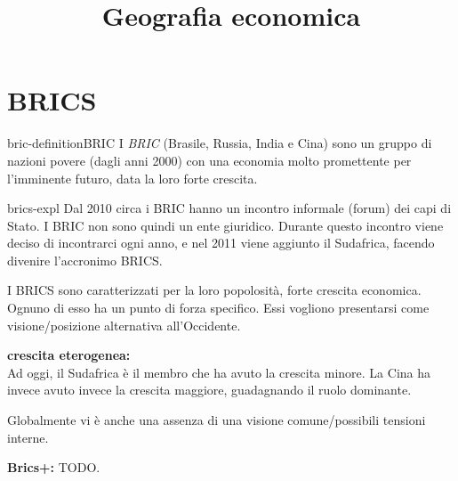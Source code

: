 \documentclass[preview]{standalone}
\begin{document}
\title{Geografia economica}
\genpage

\section{BRICS}

\begin{snippetdefinition}{bric-definition}{BRIC}
    I \textit{BRIC} (Brasile, Russia, India e Cina)
    sono un gruppo di nazioni povere (dagli anni 2000) con una economia
    molto promettente per l'imminente futuro, data la loro forte crescita. 
\end{snippetdefinition}

\begin{snippet}{brics-expl}
    Dal 2010 circa i BRIC hanno un incontro informale (forum) dei capi di Stato.
    I BRIC non sono quindi un ente giuridico.
    Durante questo incontro viene deciso di incontrarci ogni anno, e nel 2011 viene aggiunto il Sudafrica,
    facendo divenire l'accronimo BRICS.
    
    I BRICS sono caratterizzati per la loro popolosità, forte crescita economica.
    Ognuno di esso ha un punto di forza specifico.
    Essi vogliono presentarsi come visione/posizione alternativa all'Occidente.
    
    \textbf{crescita eterogenea:} \\
    Ad oggi, il Sudafrica è il membro che ha avuto la crescita minore.
    La Cina ha invece avuto invece la crescita maggiore, guadagnando il ruolo dominante.
    
    Globalmente vi è anche una assenza di una visione comune/possibili tensioni interne.
    
    \textbf{Brics+:} TODO.
\end{snippet}
\end{document}
